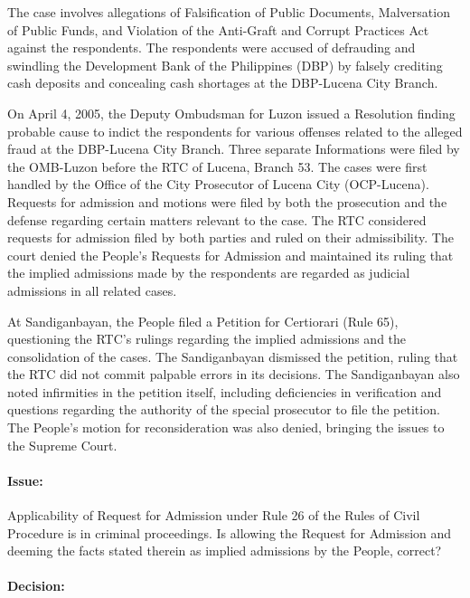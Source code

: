 \documentclass[
12pt,
oneside,
onehalfspacing,
headsepline
]{DigestCollection}
\begin{document}
The case involves allegations of Falsification of Public Documents, Malversation of Public Funds, and Violation of the Anti-Graft and Corrupt Practices Act against the respondents. The respondents were accused of defrauding and swindling the Development Bank of the Philippines (DBP) by falsely crediting cash deposits and concealing cash shortages at the DBP-Lucena City Branch.

On April 4, 2005, the Deputy Ombudsman for Luzon issued a Resolution finding probable cause to indict the respondents for various offenses related to the alleged fraud at the DBP-Lucena City Branch. Three separate Informations were filed by the OMB-Luzon before the RTC of Lucena, Branch 53. The cases were first handled by the Office of the City Prosecutor of Lucena City (OCP-Lucena). Requests for admission and motions were filed by both the prosecution and the defense regarding certain matters relevant to the case. The RTC considered requests for admission filed by both parties and ruled on their admissibility. The court denied the People's Requests for Admission and maintained its ruling that the implied admissions made by the respondents are regarded as judicial admissions in all related cases. 

At Sandiganbayan, the People filed a Petition for Certiorari (Rule 65), questioning the RTC's rulings regarding the implied admissions and the consolidation of the cases. The Sandiganbayan dismissed the petition, ruling that the RTC did not commit palpable errors in its decisions. The Sandiganbayan also noted infirmities in the petition itself, including deficiencies in verification and questions regarding the authority of the special prosecutor to file the petition. The People's motion for reconsideration was also denied, bringing the issues to the Supreme Court.

\paragraph{Issue:}
\label{11c1c730-09fe-11ef-932c-63c852f65e48}


Applicability of Request for Admission under Rule 26 of the Rules of Civil Procedure is in criminal proceedings. Is allowing the Request for Admission and deeming the facts stated therein as implied admissions by the People, correct?

\paragraph{Decision:}
\label{133aab90-09fe-11ef-932c-63c852f65e48}
\end{document}
